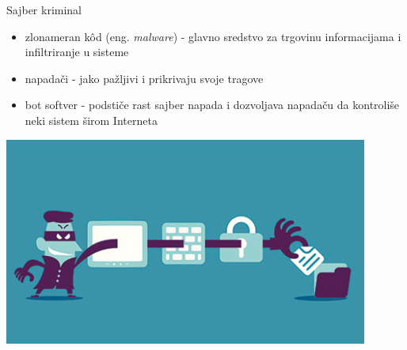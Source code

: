 \begin{frame}{Sajber kriminal}

	\begin{itemize}
		
		\item zlonameran k\^{o}d (eng. \textit{malware}) - glavno sredstvo za trgovinu informacijama i infiltriranje u sisteme
		\item napadači - jako pažljivi i prikrivaju svoje tragove
		\item bot softver - podstiče rast sajber napada i dozvoljava napadaču da kontroliše neki sistem širom Interneta
		
	\end{itemize}
	
		\centering
		\includegraphics[scale=0.4]{images/cyber_crime.png}

\end{frame}